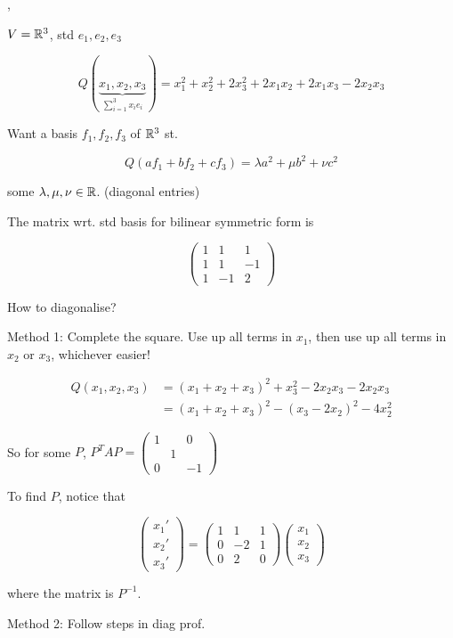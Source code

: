 \documentclass[a4paper]{article}
\begin{document}
\begin{eg},
	
	
	$ V = \mathbb{R}^{3} $, std $ e_{1},e_{2},e_{3} $
	
	
	\[ Q(\underbrace{x_{1},x_{2},x_{3}}_{\sum_{i=1}^{3}x_{i}e_{i}  }) = x_{1}^{2} + x_{2}^{2} + 2x_{3}^{2} + 2x_{1}x_{2} + 2 x_{1}x_{3} - 2 x_{2}x_{3}  \]
	
	Want a basis $ f_{1},f_{2},f_{3} $ of $ \mathbb{R}^{3} $ st. 
	
	\[ Q(af_{1} + b f_{2} + c f_{3})  = \lambda a^{2} + \mu b^{2} + \nu c^{2} \] 
	
	some $ \lambda,\mu, \nu  \in \mathbb{R} $. (diagonal entries)
	
	The matrix wrt. std basis for bilinear symmetric form is 
	
	\[ \begin{pmatrix}
	1 & 1 & 1\\
	1 & 1 & -1 \\
	1 & -1 & 2 
	\end{pmatrix} \]
	
	How to diagonalise?
	
	Method 1: Complete the square. Use up all terms in $ x_{1} $, then use up all terms in $ x_{2} $ or $ x_{3} $, whichever easier!
	
	\begin{align*}
	Q(x_{1},x_{2},x_{3})  & =  (x_{1} + x_{2} + x_{3} )^{2} + x_{3}^{2} - 2 x_{2}x_{3} - 2 x_{2}x_{3}  \\
	& =  (x_{1} + x_{2} + x_{3} )^{2} - (x_{3}  - 2x_{2} )^{2} - 4 x_{2}^{2}
	\end{align*}
	
	
	So for some $ P $, $ P^{T} A P =\begin{pmatrix}
	1 & & 0 \\
	& 1 & \\
	0 & & -1
	\end{pmatrix} $
	
	To find $ P $, notice that 
	
	\[ \begin{pmatrix}
	x_{1}' \\
	x_{2}' \\
	x_{3}'
	\end{pmatrix} = \begin{pmatrix}
	1 & 1 & 1 \\
	0 & -2 & 1\\
	0 & 2 & 0
	\end{pmatrix}\begin{pmatrix}
	x_{1} \\
	x_{2} \\
	x_{3}
	\end{pmatrix} \]
	
	where the matrix is $ P^{-1} $.
	
	Method 2: Follow steps in diag prof.
	
\end{eg}                                                 
\end{document}
